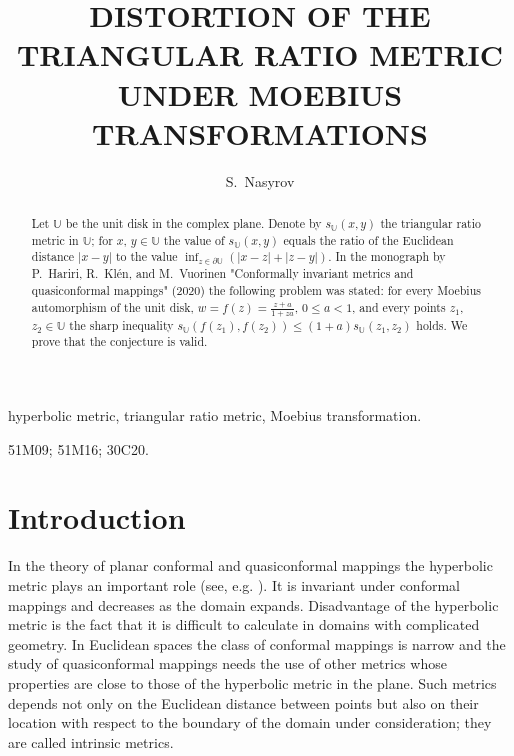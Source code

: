 \documentclass[12pt,a4paper]{amsart}
\begin{document}
\title{DISTORTION OF THE TRIANGULAR RATIO METRIC UNDER MOEBIUS TRANSFORMATIONS}

\author[S.~Nasyrov]{S.~Nasyrov}
\address{Kazan Federal University,
         Kazan, Russia}

\maketitle

\begin{abstract}
		Let $\mathbb{U}$ be the unit disk in the complex plane. Denote by $s_\mathbb{U}(x,y)$ the triangular ratio metric in $\mathbb{U}$; for $x$, $y\in \mathbb{U}$ the value of $s_\mathbb{U}(x,y)$ equals the ratio of the Euclidean distance $|x-y|$ to the value $\inf_{z\in \partial \mathbb{U}}(|x-z|+|z-y|)$.   In the monograph by P.~Hariri, R.~Kl\'en,  and M.~Vuorinen "Conformally invariant metrics and quasiconformal mappings" (2020) the following problem was stated: for every Moebius automorphism of the unit disk, $w=f(z)=\frac{z+a}{1+za}$, $0\le a<1$,  and every points $z_1$, $z_2\in \mathbb{U}$ the sharp inequality $s_\mathbb{U}(f(z_1),f(z_2))\le (1+a)s_\mathbb{U}(z_1,z_2)$ holds. We prove that the conjecture is valid.
\end{abstract}

 {hyperbolic metric, triangular ratio metric, Moebius transformation}.

 51M09; 51M16; 30C20.






\maketitle


\section*{Introduction}

In the theory of planar conformal and quasiconformal mappings the hyperbolic metric plays an important role (see, e.g. \cite{goluzin,avv,HKV}).   It is invariant under conformal mappings and decreases  as  the domain expands. Disadvantage  of the hyperbolic metric is the fact that it is difficult to calculate in domains with complicated geometry. In Euclidean spaces the class of conformal mappings is narrow and the study of quasiconformal mappings needs the use of other metrics whose properties are close to those of the hyperbolic metric in the plane. Such metrics depends not only on the Euclidean distance between points but also on their location with respect to the boundary of the domain under consideration; they are called intrinsic metrics.
\end{document}
